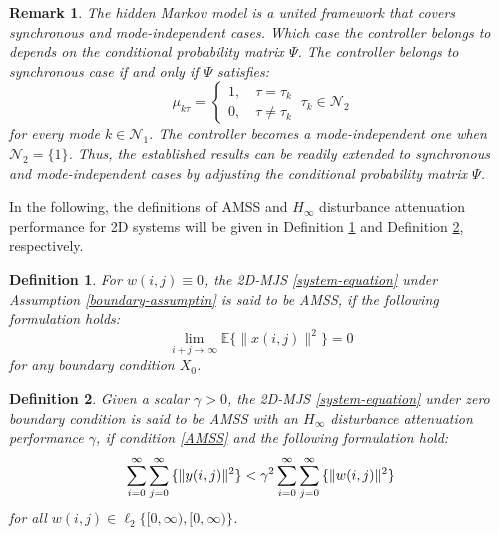 \documentclass[journal,final,twocolumn]{IEEEtran}
\newtheorem{remark}{Remark}
\newtheorem{definition}{Definition}
\begin{document}
\begin{remark}
	The hidden Markov model is a united framework that covers synchronous and mode-independent cases. Which case the controller belongs to depends on the conditional probability matrix $\varPsi$.  The controller belongs to synchronous case if and only if $\varPsi$ satisfies:
	\begin{equation*}
	\mu_{k\tau }=
	\begin{cases}
	1, \quad \tau=\tau_{k}\\
	0, \quad \tau\neq \tau_{k}
	\end{cases}\ \tau_{k}\in\mathcal{N}_{2}
	\end{equation*}
	for every mode $k\in\mathcal{N}_{1}$. The controller becomes a mode-independent one when $\mathcal{N}_{2}=\{1\}$. Thus, the established results  can be readily extended to synchronous and mode-independent cases  by adjusting the conditional probability matrix $\varPsi$.
\end{remark}
	
	In the following, the definitions of  AMSS and $H_{\infty}$ disturbance attenuation performance for 2D systems will be given in Definition \ref{mean-square-stable} and Definition \ref{H_infty-performance}, respectively.
	
	\begin{definition}\label{mean-square-stable}
	For $w(i,j)\equiv0$, the 2D-MJS \eqref{system-equation} under Assumption \ref{boundary-assumptin} is said to be AMSS,  if the following formulation holds:
	\begin{equation}\label{AMSS}
			\lim\limits_{i+j\to\infty}\mathbb{E}\{\|x(i,j)\|^{2}\} = 0
	\end{equation}
	for any boundary condition $X_{0}$.
	\end{definition}


	\begin{definition}\label{H_infty-performance}
		Given a scalar $\gamma>0$, the 2D-MJS \eqref{system-equation} under zero boundary condition is said to be AMSS with an $H_{\infty}$ disturbance attenuation performance $\gamma$, if condition \eqref{AMSS} and the following formulation hold:
		\begin{equation} \label{invDef2}
			\sum_{i=0}^{\infty}\sum_{j=0}^{\infty}\mathbb\{\|y(i,j)\|^{2}\} <  \gamma^{2} \sum_{i=0}^{\infty}\sum_{j=0}^{\infty}\mathbb\{\|w(i,j)\|^{2}\}
		\end{equation}
		for all $w(i,j)\in\ell_{2}\{[0,\infty),[0,\infty)\}$.
	\end{definition}
	
\end{document}
